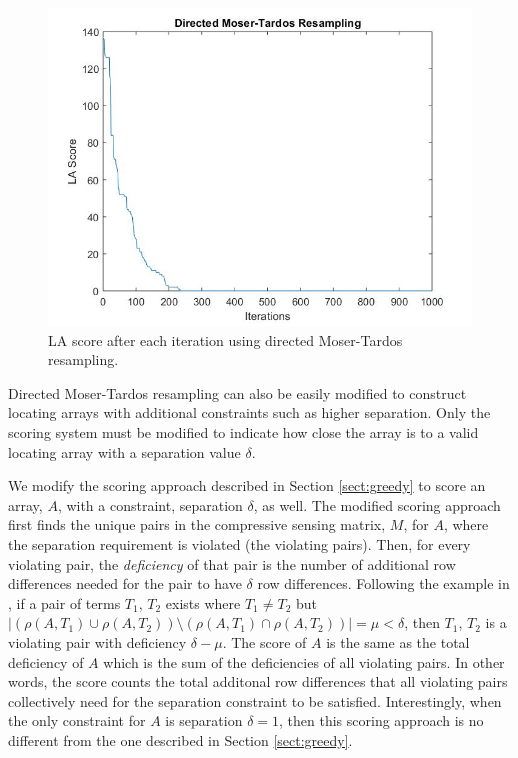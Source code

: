 \begin{center}

\begin{figure}[htbp]
\caption{LA score after each iteration using directed Moser-Tardos resampling.}
\label{fig:construction_directed_random}
\includegraphics[width=\textwidth,keepaspectratio]{images/directed_random_construction}
\end{figure}

\end{center}

Directed Moser-Tardos resampling can also be easily modified to construct locating arrays with additional constraints such as higher separation.
Only the scoring system must be modified to indicate how close the array is to a valid locating array with a separation value $\delta$.

We modify the scoring approach described in Section \ref{sect:greedy} to score an array, $A$, with a constraint, separation $\delta$, as well.
The modified scoring approach first finds the unique pairs in the compressive sensing matrix, $M$, for $A$, where the separation requirement is violated (the violating pairs).
Then, for every violating pair, the {\em deficiency} of that pair is the number of additional row differences needed for the pair to have $\delta$ row differences.
Following the example in \cite{seidelIWOCA}, if a pair of terms $T_1$, $T_2$ exists where $T_1 \neq T_2$ but $|(\rho(A,T_1) \cup \rho(A,T_2)) \setminus ( \rho(A,T_1) \cap \rho(A,T_2))| = \mu < \delta$, then $T_1$, $T_2$ is a violating pair with deficiency $\delta-\mu$.
The score of $A$ is the same as the total deficiency of $A$ which is the sum of the deficiencies of all violating pairs.
In other words, the score counts the total additonal row differences that all violating pairs collectively need for the separation constraint to be satisfied.
Interestingly, when the only constraint for $A$ is separation $\delta = 1$, then this scoring approach is no different from the one described in Section \ref{sect:greedy}.

